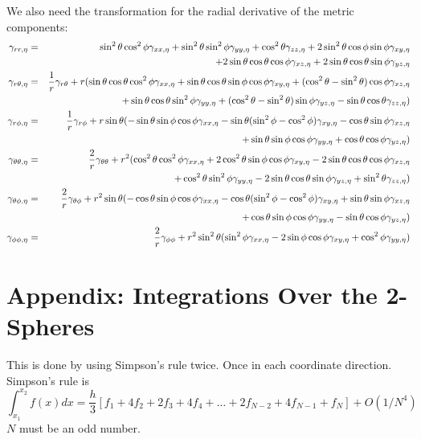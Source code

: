 We also need 
the transformation for the radial derivative of the metric components:
\begin{eqnarray*}
\gamma_{rr,\eta}&=&
\sin^2\theta\cos^2\phi\gamma_{xx,\eta}
+\sin^2\theta\sin^2\phi\gamma_{yy,\eta}
+\cos^2\theta\gamma_{zz,\eta}
+2\sin^2\theta\cos\phi\sin\phi\gamma_{xy,\eta}
\\
&&
+2\sin\theta\cos\theta\cos\phi\gamma_{xz,\eta}
+2\sin\theta\cos\theta\sin\phi\gamma_{yz,\eta}
\\
\gamma_{r\theta,\eta}&=& 
\frac{1}{r}\gamma_{r\theta}+
r(\sin\theta\cos\theta\cos^2\phi\gamma_{xx,\eta}
+\sin\theta\cos\theta\sin\phi\cos\phi\gamma_{xy,\eta}
+(\cos^2\theta-\sin^2\theta)\cos\phi\gamma_{xz,\eta}
\\
&&
+\sin\theta\cos\theta\sin^2\phi\gamma_{yy,\eta}
+(\cos^2\theta-\sin^2\theta)\sin\phi\gamma_{yz,\eta}
-\sin\theta\cos\theta\gamma_{zz,\eta})
\\
\gamma_{r\phi,\eta}&=&
\frac{1}{r}\gamma_{r\phi}+
r\sin\theta(-\sin\theta\sin\phi\cos\phi\gamma_{xx,\eta}
-\sin\theta(\sin^2\phi-\cos^2\phi)\gamma_{xy,\eta}
-\cos\theta\sin\phi\gamma_{xz,\eta}
\\
&&
+\sin\theta\sin\phi\cos\phi\gamma_{yy,\eta}
+\cos\theta\cos\phi\gamma_{yz,\eta})
\\
\gamma_{\theta\theta,\eta}&=&
\frac{2}{r}\gamma_{\theta\theta}+
r^2(\cos^2\theta\cos^2\phi\gamma_{xx,\eta}
+2\cos^2\theta\sin\phi\cos\phi\gamma_{xy,\eta}
-2\sin\theta\cos\theta\cos\phi\gamma_{xz,\eta}
\\
&&
+\cos^2\theta\sin^2\phi\gamma_{yy,\eta}
-2\sin\theta\cos\theta\sin\phi\gamma_{yz,\eta}
+\sin^2\theta\gamma_{zz,\eta})
\\
\gamma_{\theta\phi,\eta}&=&
\frac{2}{r}\gamma_{\theta\phi}+
r^2\sin\theta(-\cos\theta\sin\phi\cos\phi\gamma_{xx,\eta}
-\cos\theta(\sin^2\phi-\cos^2\phi)\gamma_{xy,\eta}
+\sin\theta\sin\phi\gamma_{xz,\eta}
\\
&&
+\cos\theta\sin\phi\cos\phi\gamma_{yy,\eta}
-\sin\theta\cos\phi\gamma_{yz,\eta})
\\
\gamma_{\phi\phi,\eta}&=&
\frac{2}{r}\gamma_{\phi\phi}+
r^2\sin^2\theta(\sin^2\phi\gamma_{xx,\eta}
-2\sin\phi\cos\phi\gamma_{xy,\eta}
+\cos^2\phi\gamma_{yy,\eta})
\end{eqnarray*}

\section{Appendix: Integrations Over the 2-Spheres}


This is done by using Simpson's rule twice. Once in each coordinate 
direction. Simpson's rule is
\begin{equation}
\int^{x_2}_{x_1} f(x) dx = 
  \frac{h}{3} [f_1+4f_2+2f_3+4f_4+\ldots+2f_{N-2}+4 f_{N-1}+f_N]
  +O(1/N^4)
\end{equation}
$N$ must be an odd number.


